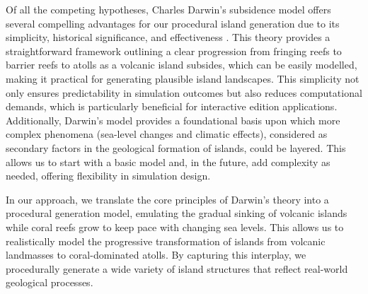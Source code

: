 Of all the competing hypotheses, Charles Darwin's subsidence model offers several compelling advantages for our procedural island generation due to its simplicity, historical significance, and effectiveness \cite{Tomascik1997}. This theory provides a straightforward framework outlining a clear progression from fringing reefs to barrier reefs to atolls as a volcanic island subsides, which can be easily modelled, making it practical for generating plausible island landscapes. This simplicity not only ensures predictability in simulation outcomes but also reduces computational demands, which is particularly beneficial for interactive edition applications. Additionally, Darwin's model provides a foundational basis upon which more complex phenomena (sea-level changes and climatic effects), considered as secondary factors in the geological formation of islands, could be layered. This allows us to start with a basic model and, in the future, add complexity as needed, offering flexibility in simulation design.

In our approach, we translate the core principles of Darwin's theory into a procedural generation model, emulating the gradual sinking of volcanic islands while coral reefs grow to keep pace with changing sea levels. This allows us to realistically model the progressive transformation of islands from volcanic landmasses to coral-dominated atolls. By capturing this interplay, we procedurally generate a wide variety of island structures that reflect real-world geological processes.

